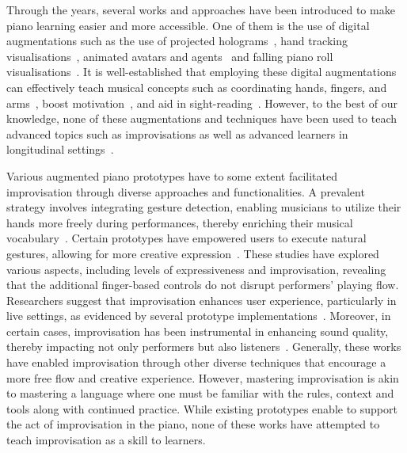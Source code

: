 \documentclass{vgtc}                          %
\begin{document}
\par Through the years, several works and approaches have been introduced to make piano learning easier and more accessible. One of them is the use of digital augmentations such as the use of projected holograms~\cite{xiao2010mirrorfugue, xiao2011duet, cai2019designa, gerry2019adept}, hand tracking visualisations~\cite{barakonyi2005augmented, huang2011piano}, animated avatars and agents~\cite{fernandez2016piano, xiao2014andante} and falling piano roll visualisations~\cite{weing2013piano, takegawa2012piano, rogers2014piano, birhanu2017keynvision}. It is well-established that employing these digital augmentations can effectively teach musical concepts such as coordinating hands, fingers, and arms~\cite{barakonyi2005augmented}, boost motivation~\cite{rogers2014piano, montano1984effect}, and aid in sight-reading~\cite{chiang2015oncall, schmalstieg2007experiences, yang2012augmented, yang2013visual}. However, to the best of our knowledge, none of these augmentations and techniques have been used to teach advanced topics such as improvisations as well as advanced learners in longitudinal settings~\cite{deja2022survey}. 

\par Various augmented piano prototypes have to some extent facilitated improvisation through diverse approaches and functionalities. A prevalent strategy involves integrating gesture detection, enabling musicians to utilize their hands more freely during performances, thereby enriching their musical vocabulary~\cite{schmalstieg2007experiences, mcpherson2010augmenting, mcpherson2010toward, sandnes2019enhanced, das2017music}. Certain prototypes have empowered users to execute natural gestures, allowing for more creative expression~\cite{karolus2020hit, granieri2019reach, ogata2017keyboard}. These studies have explored various aspects, including levels of expressiveness and improvisation, revealing that the additional finger-based controls do not disrupt performers' playing flow. Researchers suggest that improvisation enhances user experience, particularly in live settings, as evidenced by several prototype implementations~\cite{nicolls2012gesturally, xiao2013mirrorfugue, das2017music, santiniaugmented}. Moreover, in certain cases, improvisation has been instrumental in enhancing sound quality, thereby impacting not only performers but also listeners~\cite{dahlstedt2015mapping, yang2012augmented, yang2013visual}. Generally, these works have enabled improvisation through other diverse techniques that encourage a more free flow and creative experience. However, mastering improvisation is akin to mastering a language where one must be familiar with the rules, context and tools along with continued practice. While existing prototypes enable to support the act of improvisation in the piano, none of these works have attempted to teach improvisation as a skill to learners. 
\end{document}

